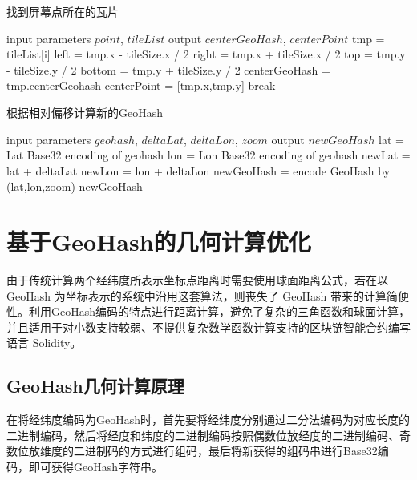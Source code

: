 \begin{algorithm}[t]
  \caption{找到屏幕点所在的瓦片}
  \label{alg:findCenterTile}
  \begin{algorithmic}[1]
  \REQUIRE input parameters $point$, $tileList$
  \ENSURE output $centerGeoHash$, $centerPoint$
    \STATE tmp = tileList[i]
    \STATE left = tmp.x - tileSize.x / 2
    \STATE right = tmp.x + tileSize.x / 2
    \STATE top = tmp.y - tileSize.y / 2
    \STATE bottom = tmp.y + tileSize.y / 2
      \STATE centerGeoHash = tmp.centerGeohash
      \STATE centerPoint = [tmp.x,tmp.y]
      \STATE break
    \ENDIF
  \ENDFOR
  \end{algorithmic}
\end{algorithm}

\begin{algorithm}[t]
  \caption{根据相对偏移计算新的GeoHash}
  \label{alg:newGeoHash}
  \begin{algorithmic}[1]
  \REQUIRE input parameters $geohash$, $deltaLat$, $deltaLon$, $zoom$
  \ENSURE output $newGeoHash$
  \STATE lat = Lat Base32 encoding of geohash
	\STATE lon = Lon Base32 encoding of geohash
	\STATE newLat = lat + deltaLat
	\STATE newLon = lon + deltaLon
	\STATE newGeoHash = encode GeoHash by (lat,lon,zoom)
  \RETURN newGeoHash
  \end{algorithmic}
\end{algorithm}


\section{基于GeoHash的几何计算优化}
由于传统计算两个经纬度所表示坐标点距离时需要使用球面距离公式，若在以 GeoHash 为坐标表示的系统中沿用这套算法，则丧失了 GeoHash 带来的计算简便性。利用GeoHash编码的特点进行距离计算，避免了复杂的三角函数和球面计算，并且适用于对小数支持较弱、不提供复杂数学函数计算支持的区块链智能合约编写语言 Solidity。\par

\subsection{GeoHash几何计算原理}

在将经纬度编码为GeoHash时，首先要将经纬度分别通过二分法编码为对应长度的二进制编码，然后将经度和纬度的二进制编码按照偶数位放经度的二进制编码、奇数位放维度的二进制码的方式进行组码，最后将新获得的组码串进行Base32编码，即可获得GeoHash字符串。\par

